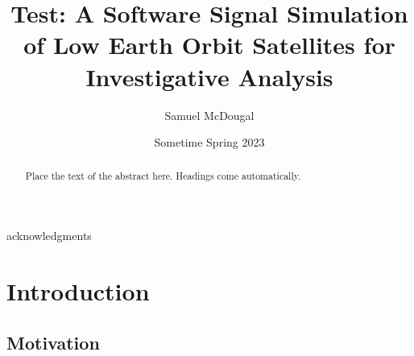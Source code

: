 \documentclass[12pt]{report}
\title{Test: A Software Signal Simulation of Low Earth Orbit Satellites for Investigative Analysis}
\author{Samuel McDougal}
\date{Sometime Spring 2023} %
\begin{document}
\begin{romanpages}      %

\TitlePage 

\begin{abstract} 
Place the text of the abstract here. Headings come automatically.
\end{abstract}

\begin{acknowledgments}
acknowledgments
\end{acknowledgments}

\begin{singlespace}

\begin{center} 
\renewcommand{\cftchapfont}{}
\renewcommand{\cftchappagefont}{}
\renewcommand{\cfttoctitlefont}{\normalsize}%
\renewcommand{\cftsecfont }{\normalsize}%
\renewcommand{\cftsecpagefont}{\normalsize}%
\tableofcontents 
\newpage
\renewcommand{\cftchapfont}{}
\renewcommand{\cftchappagefont}{}
\renewcommand{\cftloftitlefont}{\normalsize}%
\renewcommand{\cftsecfont}{\normalsize}%
\renewcommand{\cftsecpagefont}{\normalsize}%
\listoffigures
\newpage
\renewcommand{\cftchapfont}{}
\renewcommand{\cftchappagefont}{}
\renewcommand{\cftlottitlefont}{\normalsize}%
\renewcommand{\cftsecfont}{\normalsize}%
\renewcommand{\cftsecpagefont}{\normalsize}%
\listoftables
\end{center}
\end{singlespace}

\printnomenclature[0.5in] %
\end{romanpages}        %


\normalem       %

 \chapter { Introduction}  %

\section { \normalfont Motivation}
\end{document}
